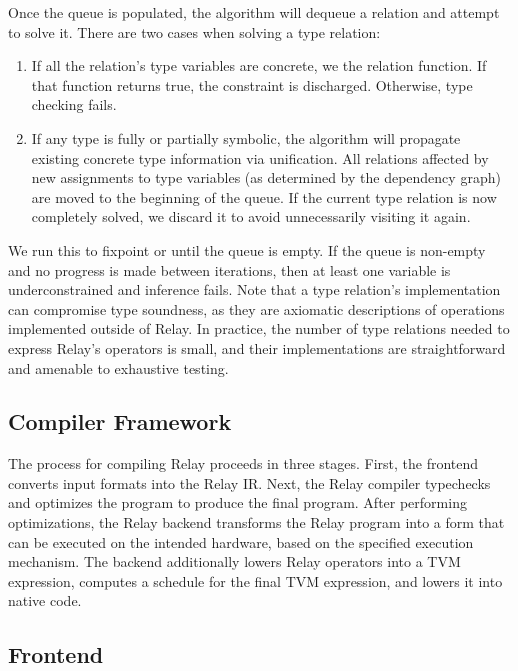 Once the queue is populated, the algorithm will dequeue a relation and attempt to solve it.
There are two cases when solving a type relation:
\begin{enumerate}
  \item If all the relation's type variables
  are concrete, we the relation function. If that function returns true, the
  constraint is discharged. Otherwise, type checking fails.
  \item If any type is fully or partially symbolic, the
    algorithm will propagate
    existing concrete type information via unification.
  All relations affected by new assignments to type
    variables (as determined by the dependency graph)
    are moved to the beginning of the queue.
  If the current type relation is now completely solved, we
  discard it to avoid unnecessarily visiting it again.
\end{enumerate}

We run this to fixpoint or until the queue is empty.
If the queue is non-empty and no progress is made between iterations,
  then at least one variable is underconstrained and inference fails.
Note that a type relation's implementation can
  compromise type soundness, as they are axiomatic descriptions
  of operations implemented outside of Relay.
In practice, the number of type relations needed to express Relay's
  operators is small, and their implementations are straightforward
  and amenable to exhaustive testing.

\subsection{Compiler Framework}

The process for compiling Relay proceeds in three stages.
First, the frontend converts input formats into the Relay IR.
Next, the Relay compiler typechecks and optimizes the program
  to produce the final program.
After performing optimizations,
  the Relay backend transforms
  the Relay program into a form that can be executed on
  the intended hardware, based on the specified execution mechanism.
The backend additionally lowers Relay operators into a TVM expression,
  computes a schedule for the final TVM expression, and lowers it into
  native code.

\subsection*{Frontend}

